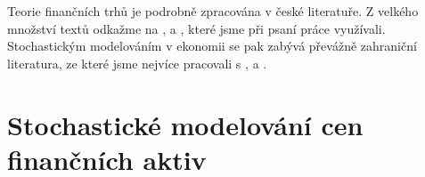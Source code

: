 \documentclass[a4paper,12pt]{report}
\theoremstyle{definition} \newtheorem{definice}[veta]{Definice}
\theoremstyle{remark}
\begin{document}

Teorie finančních trhů je podrobně zpracována v české literatuře.
Z velkého množství textů odkažme na \cite{rejnus2011}, \cite{fuchsfinancni} a \cite{veselainvestovani}, které jsme při psaní práce využívali.
Stochastickým modelováním v ekonomii se pak zabývá převážně zahraniční literatura, ze které jsme nejvíce pracovali s \cite{hull}, \cite{wilmott1995mathematics} a \cite{karatzas1998methods}.

\section{Stochastické modelování cen finančních aktiv}\label{stoch_model_aktiv}



\end{document}
